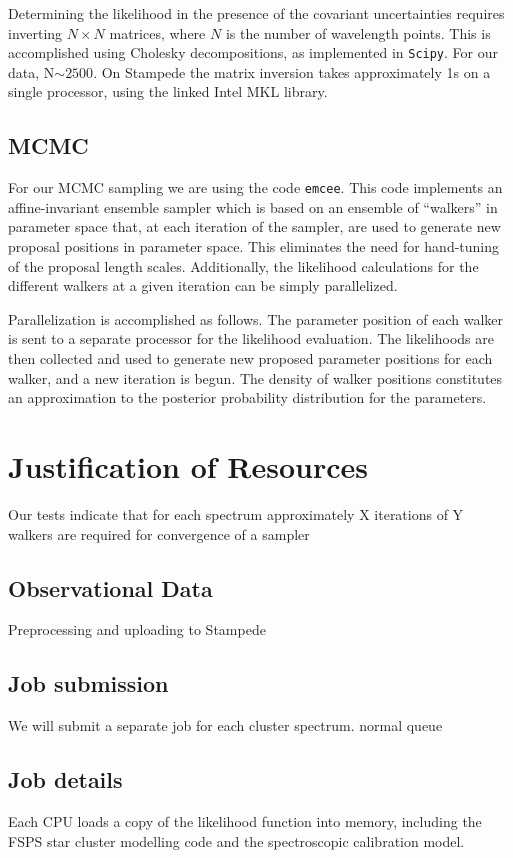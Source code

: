 \documentclass[11pt,preprint]{aastex}
\begin{document}
Determining the likelihood in the presence of the covariant uncertainties requires inverting $N \times N$ matrices, where $N$ is the number of wavelength points.  
This is accomplished using Cholesky decompositions, as implemented in \texttt{Scipy}.  
For our data, N$\sim 2500$.  
On Stampede the matrix inversion takes approximately 1s on a single processor, using the linked Intel MKL library.

\subsection{MCMC}
For our MCMC sampling we are using the code \texttt{emcee}.  
This code implements an affine-invariant ensemble sampler \citep{goodman_weare} which is based on an ensemble of ``walkers'' in parameter space that, at each iteration of the sampler, are used to generate new proposal positions in parameter space.  
This eliminates the need for hand-tuning of the proposal length scales.  
Additionally, the likelihood calculations for the different walkers at a given iteration can be simply parallelized.

Parallelization is accomplished as follows. 
The parameter position of each walker is sent to a separate processor for the likelihood evaluation. 
The likelihoods are then collected and used to generate new proposed parameter positions for each walker, and a new iteration is begun.  
The density of walker positions constitutes an approximation to the posterior probability distribution for the parameters.

\section{Justification of Resources}
Our tests indicate that for each spectrum approximately X iterations of Y walkers are required for convergence of a sampler

\subsection{Observational Data}
Preprocessing and uploading to Stampede

\subsection{Job submission}
We will submit a separate job for each cluster spectrum. normal queue

\subsection{Job details}
Each CPU loads a copy of the likelihood function into memory, including the FSPS star cluster modelling code and the spectroscopic calibration model.
\end{document}
